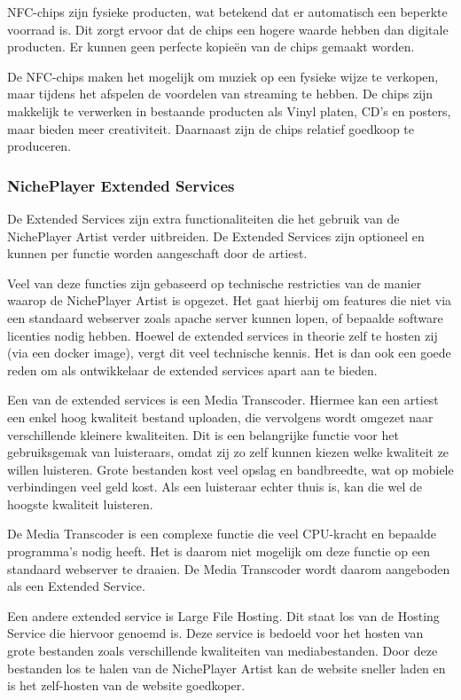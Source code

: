 NFC-chips zijn fysieke producten, wat betekend dat er automatisch een beperkte voorraad is. Dit zorgt ervoor dat de chips een hogere waarde hebben dan digitale producten. Er kunnen geen perfecte kopieën van de chips gemaakt worden.

De NFC-chips maken het mogelijk om muziek op een fysieke wijze te verkopen, maar tijdens het afspelen de voordelen van streaming te hebben. De chips zijn makkelijk te verwerken in bestaande producten als Vinyl platen, CD's en posters, maar bieden meer creativiteit. Daarnaast zijn de chips relatief goedkoop te produceren.

\subsubsection*{NichePlayer Extended Services}
De Extended Services zijn extra functionaliteiten die het gebruik van de NichePlayer Artist verder uitbreiden. De Extended Services zijn optioneel en kunnen per functie worden aangeschaft door de artiest.

Veel van deze functies zijn gebaseerd op technische restricties van de manier waarop de NichePlayer Artist is opgezet. Het gaat hierbij om features die niet via een standaard webserver zoals apache server kunnen lopen, of bepaalde software licenties nodig hebben. Hoewel de extended services in theorie zelf te hosten zij (via een docker image), vergt dit veel technische kennis. Het is dan ook een goede reden om als ontwikkelaar de extended services apart aan te bieden.

Een van de extended services is een Media Transcoder. Hiermee kan een artiest een enkel hoog kwaliteit bestand uploaden, die vervolgens wordt omgezet naar verschillende kleinere kwaliteiten. Dit is een belangrijke functie voor het gebruiksgemak van luisteraars, omdat zij zo zelf kunnen kiezen welke kwaliteit ze willen luisteren. Grote bestanden kost veel opslag en bandbreedte, wat op mobiele verbindingen veel geld kost. Als een luisteraar echter thuis is, kan die wel de hoogste kwaliteit luisteren.

De Media Transcoder is een complexe functie die veel CPU-kracht en bepaalde programma's  nodig heeft. Het is daarom niet mogelijk om deze functie op een standaard webserver te draaien. De Media Transcoder wordt daarom aangeboden als een Extended Service.

Een andere extended service is Large File Hosting. Dit staat los van de Hosting Service die hiervoor genoemd is. Deze service is bedoeld voor het hosten van grote bestanden zoals verschillende kwaliteiten van mediabestanden. Door deze bestanden los te halen van de NichePlayer Artist kan de website sneller laden en is het zelf-hosten van de website goedkoper.

